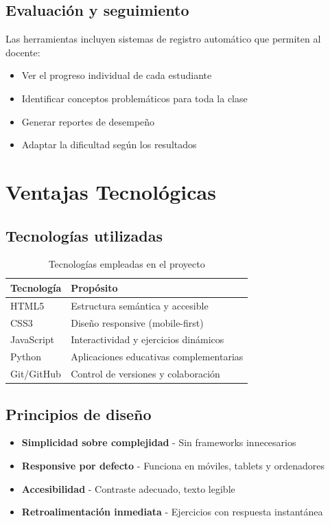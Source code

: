 \documentclass[12pt,spanish]{article}
\begin{document}
\subsection{Evaluación y seguimiento}

Las herramientas incluyen sistemas de registro automático que permiten al docente:

\begin{itemize}
    \item Ver el progreso individual de cada estudiante
    \item Identificar conceptos problemáticos para toda la clase
    \item Generar reportes de desempeño
    \item Adaptar la dificultad según los resultados
\end{itemize}

\section{Ventajas Tecnológicas}

\subsection{Tecnologías utilizadas}

\begin{table}[H]
\centering
\caption{Tecnologías empleadas en el proyecto}
\label{tab:tecnologias}
\begin{tabular}{|p{3cm}|p{10cm}|}
\hline
\textbf{Tecnología} & \textbf{Propósito} \\
\hline
HTML5 & Estructura semántica y accesible \\
\hline
CSS3 & Diseño responsive (mobile-first) \\
\hline
JavaScript & Interactividad y ejercicios dinámicos \\
\hline
Python & Aplicaciones educativas complementarias \\
\hline
Git/GitHub & Control de versiones y colaboración \\
\hline
\end{tabular}
\end{table}

\subsection{Principios de diseño}

\begin{itemize}
    \item \textbf{Simplicidad sobre complejidad} - Sin frameworks innecesarios
    \item \textbf{Responsive por defecto} - Funciona en móviles, tablets y ordenadores
    \item \textbf{Accesibilidad} - Contraste adecuado, texto legible
    \item \textbf{Retroalimentación inmediata} - Ejercicios con respuesta instantánea
\end{itemize}
\end{document}
